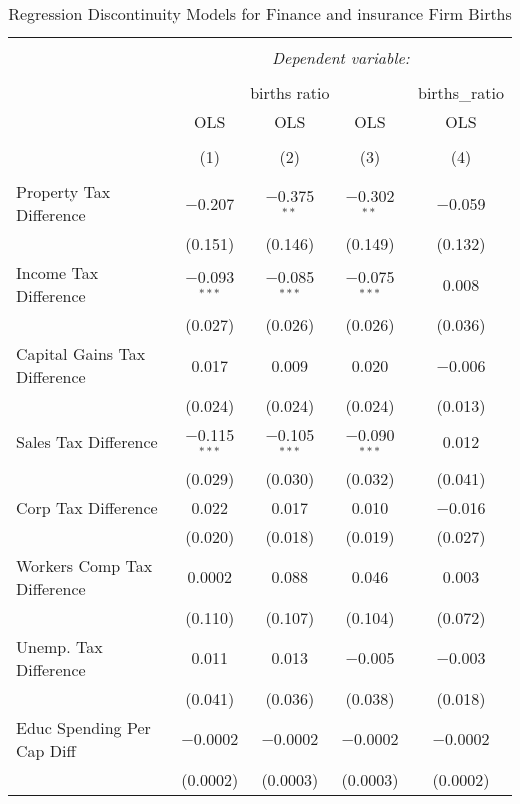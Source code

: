 
\begin{table}[!htbp] \centering 
  \caption{Regression Discontinuity Models for  Finance and insurance Firm Births} 
  \label{52rd} 
\begin{tabular}{@{\extracolsep{5pt}}lcccc} 
\\[-1.8ex]\hline 
\hline \\[-1.8ex] 
 & \multicolumn{4}{c}{\textit{Dependent variable:}} \\ 
\cline{2-5} 
\\[-1.8ex] & \multicolumn{3}{c}{births ratio} & births\_ratio \\ 
 & OLS & OLS & OLS & OLS \\ 
\\[-1.8ex] & (1) & (2) & (3) & (4)\\ 
\hline \\[-1.8ex] 
 Property Tax Difference & $-$0.207 & $-$0.375$^{**}$ & $-$0.302$^{**}$ & $-$0.059 \\ 
  & (0.151) & (0.146) & (0.149) & (0.132) \\ 
  Income Tax Difference & $-$0.093$^{***}$ & $-$0.085$^{***}$ & $-$0.075$^{***}$ & 0.008 \\ 
  & (0.027) & (0.026) & (0.026) & (0.036) \\ 
  Capital Gains Tax Difference & 0.017 & 0.009 & 0.020 & $-$0.006 \\ 
  & (0.024) & (0.024) & (0.024) & (0.013) \\ 
  Sales Tax Difference & $-$0.115$^{***}$ & $-$0.105$^{***}$ & $-$0.090$^{***}$ & 0.012 \\ 
  & (0.029) & (0.030) & (0.032) & (0.041) \\ 
  Corp Tax Difference & 0.022 & 0.017 & 0.010 & $-$0.016 \\ 
  & (0.020) & (0.018) & (0.019) & (0.027) \\ 
  Workers Comp Tax Difference & 0.0002 & 0.088 & 0.046 & 0.003 \\ 
  & (0.110) & (0.107) & (0.104) & (0.072) \\ 
  Unemp. Tax Difference & 0.011 & 0.013 & $-$0.005 & $-$0.003 \\ 
  & (0.041) & (0.036) & (0.038) & (0.018) \\ 
  Educ Spending Per Cap Diff & $-$0.0002 & $-$0.0002 & $-$0.0002 & $-$0.0002 \\ 
  & (0.0002) & (0.0003) & (0.0003) & (0.0002) \\ 

\end{tabular}
\end{table}
